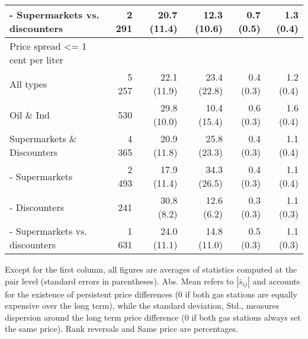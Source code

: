 \documentclass[english]{article}
\begin{document}
\begin{table}[htb!]
\begin{threeparttable}
\begin{tabular}{lrrrrr}
    \hspace*{4mm} - Supermarkets vs. discounters & 2 291 & 20.7 (11.4) & 12.3 (10.6) & 0.7 (0.5) & 1.3 (0.4) \\
    \midrule
    Price spread <= 1 cent per liter &       &       &       &       &  \\
    All types & 5 257 & 22.1 (11.9) & 23.4 (22.8) & 0.4 (0.3) & 1.2 (0.4) \\
    Oil \& Ind & 530   & 29.8 (10.0) & 10.4 (15.4) & 0.6 (0.3) & 1.6 (0.4) \\
    Supermarkets \& Discounters & 4 365 & 20.9 (11.8) & 25.8 (23.3) & 0.4 (0.3) & 1.1 (0.4) \\
    \hspace*{4mm} - Supermarkets & 2 493 & 17.9 (11.4) & 34.3 (26.5) & 0.4 (0.3) & 1.1 (0.4) \\
    \hspace*{4mm} - Discounters & 241   & 30.8 \phantom{0}(8.2) & 12.6 \phantom{0}(6.2) & 0.3 (0.3) & 1.1 (0.3) \\
    \hspace*{4mm} - Supermarkets vs. discounters & 1 631 & 24.0 (11.1) & 14.8 (11.0) & 0.5 (0.3) & 1.1 (0.3) \\
    \bottomrule
    \bottomrule
\end{tabular}
\begin{tablenotes}
			\small
      \item Except for the first column, all figures are averages of statistics computed at the pair level (standard errors in parentheses). Abs. Mean refers to $|\bar{s}_{ij}|$ and accounts for the existence of persistent price differences (0 if both gas stations are equally expensive over the long term), while the standard deviation, Std., measures dispersion around the long term price difference (0 if both gas stations always set the same price). Rank reversals and Same price are percentages.
\end{tablenotes}
\end{threeparttable}
\end{table}
\end{document}
